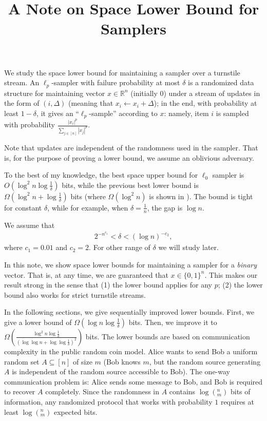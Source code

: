 \documentclass[10pt]{article}
\title{A Note on Space Lower Bound for Samplers}
\begin{document}
	
\maketitle

We study the space lower bound for maintaining a sampler over a turnstile stream. An $\ell_p$-sampler with failure probability at most $\delta$ is a randomized data structure for maintaining vector $x\in \mathbb{R}^n$ (initially 0) under a stream of updates in the form of $(i, \Delta)$ (meaning that $x_i \leftarrow x_i+\Delta$); in the end, with probability at least $1-\delta$, it gives an ``$\ell_p$-sample'' according to $x$: namely, item $i$ is sampled with probability $\frac{|x_i|^p}{\sum_{j\in [n]}{|x_j|^p}}$. 

Note that updates are independent of the randomness used in the sampler. That is, for the purpose of proving a lower bound, we assume an oblivious adversary. 

To the best of my knowledge, the best space upper bound for $\ell_0$ sampler is $O(\log^2 n \log \frac{1}{\delta})$ bits, while the previous best lower bound is $\Omega(\log^2 n +\log\frac{1}{\delta})$ bits (where $\Omega(\log^2 n)$ is shown in \cite{jowhari2011tight}). The bound is tight for constant $\delta$, while for example, when $\delta=\frac{1}{n}$, the gap is $\log n$. 

We assume that 
\begin{align} \label{formula:delta-range}
2^{-n^{c_1}}<\delta<(\log n)^{-c_2},
\end{align}
where $c_1=0.01$ and $c_2=2$. For other range of $\delta$ we will study later.

In this note, we show space lower bounds for maintaining a sampler for a {\em binary} vector. That is, at any time, we are guaranteed that $x\in \{0,1\}^n$. This makes our result strong in the sense that (1) the lower bound applies for any $p$; (2) the lower bound also works for strict turnstile streams.

In the following sections, we give sequentially improved lower bounds. First, we give a lower bound of $\Omega(\log n \log \frac{1}{\delta})$ bits. Then, we improve it to $\Omega(\frac{\log^2 n \log \frac{1}{\delta}}{(\log\log n + \log\log \frac{1}{\delta})^2})$ bits. The lower bounds are based on communication complexity in the public random coin model. Alice wants to send Bob a uniform random set $A\subseteq [n]$ of size $m$ (Bob knows $m$, but the random source generating $A$ is independent of the random source accessible to Bob). The one-way communication problem is: Alice sends some message to Bob, and Bob is required to recover $A$ completely. Since the randomness in $A$ contains $\log (^n_m)$ bits of information, any randomized protocol that works with probability $1$ requires at least $\log (^n_m)$ expected bits. 
\end{document}
